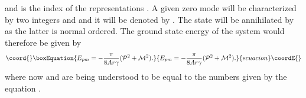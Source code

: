 \documentclass[a4paper,12pt]{article}
\begin{document}
and \coordHE{}  \coordHE{} is  the index of the representations \coordHE{}  \coordHE{}. 
A given zero mode will be characterized by two integers \coordHE{} and \coordHE{} and it 
will be denoted by \coordHE{} . The state  \coordHE{} will be
annihilated by \coordHE{} as the latter is normal ordered.
The ground state energy of the system would therefore be given by
\begin{equation}\coord{}\boxEquation{
E_{pm}=-\frac{\pi}{8Ar{\gamma}}({\cal P}^2 + {\cal M}^2).
}{
E_{pm}=-\frac{\pi}{8Ar{\gamma}}({\cal P}^2 + {\cal M}^2).
}{ecuacion}\coordE{}\end{equation}
where now \coordHE{} and \coordHE{} are being understood 
to be equal to the numbers given by the equation \coordHE{}. 
   
\end{document}
